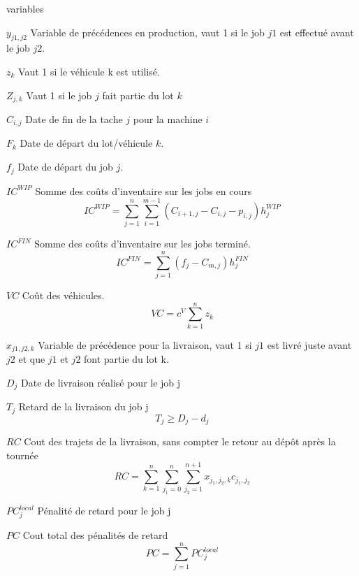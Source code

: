 \documentclass{article}
\begin{document}
\begin{labeling}{variables}
	\item [$y_{j1,j2}$] Variable de précédences en production, vaut 1 si le job $j1$ est effectué avant le job $j2$.
	\item [$z_k$] Vaut 1 si le véhicule k est utilisé.
	\item [$Z_{j,k}$] Vaut 1 si le job $j$ fait partie du lot $k$
	\item [$C_{i,j}$] Date de fin de la tache $j$ pour la machine $i$
	\item [$F_k$] Date de départ du lot/véhicule $k$.
	\item [$f_j$] Date de départ du job $j$.
	\item [$IC^{WIP}$] Somme des coûts d’inventaire sur les jobs en cours
	$$IC^{WIP}=\sum_{j=1}^{n}\sum_{i=1}^{m-1}{\left(C_{i+1,j}-C_{i,j}-p_{i,j}\right)h_j^{WIP}}$$

	\item [$IC^{FIN}$] Somme des coûts d’inventaire sur les jobs terminé.
	$${IC}^{FIN}=\sum_{j=1}^{n}{\left(f_j-C_{m,j}\right)h_j^{FIN}}$$
	\item[$VC$] Coût des véhicules.
	$$VC=c^V\sum_{k=1}^{n}z_k$$

	\item [$x_{j1,j2,k}$] Variable de précédence pour la livraison, vaut 1 si $j1$ est livré juste avant $j2$ et que $j1$ et $j2$ font partie du lot k.
	\item [$D_j$] Date de livraison réalisé pour le job j
	\item [$T_j$] Retard de la livraison du job j
	$$T_j\geq D_j-d_j$$
	\item [$RC$] Cout des trajets de la livraison, sans compter le retour au dépôt après la tournée
	$$RC=\sum_{k=1}^{n}{\sum_{j_1=0}^{n}\sum_{j_2=1}^{n+1}x_{j_1,j_2,k}c_{j_1,j_2}}$$
	\item [${PC}_j^{local}$] Pénalité de retard pour le job j
	\item [$PC$]	Cout total des pénalités de retard
	$$PC=\sum_{j=1}^{n}{PC}_j^{local}$$


\end{labeling}
\end{document}
